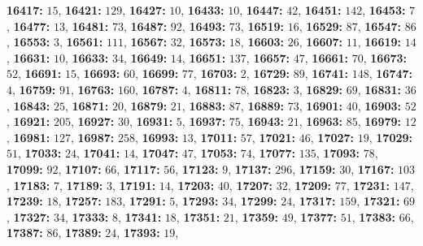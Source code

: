\textsf{\bfseries 16417:} $15$, \textsf{\bfseries 16421:} $129$, \textsf{\bfseries 16427:} $10$, \textsf{\bfseries 16433:} $10$, \textsf{\bfseries 16447:} $42$, \textsf{\bfseries 16451:} $142$, \textsf{\bfseries 16453:} $7$, \textsf{\bfseries 16477:} $13$, \textsf{\bfseries 16481:} $73$, \textsf{\bfseries 16487:} $92$, \textsf{\bfseries 16493:} $73$, \textsf{\bfseries 16519:} $16$, \textsf{\bfseries 16529:} $87$, \textsf{\bfseries 16547:} $86$, \textsf{\bfseries 16553:} $3$, \textsf{\bfseries 16561:} $111$, \textsf{\bfseries 16567:} $32$, \textsf{\bfseries 16573:} $18$, \textsf{\bfseries 16603:} $26$, \textsf{\bfseries 16607:} $11$, \textsf{\bfseries 16619:} $14$, \textsf{\bfseries 16631:} $10$, \textsf{\bfseries 16633:} $34$, \textsf{\bfseries 16649:} $14$, \textsf{\bfseries 16651:} $137$, \textsf{\bfseries 16657:} $47$, \textsf{\bfseries 16661:} $70$, \textsf{\bfseries 16673:} $52$, \textsf{\bfseries 16691:} $15$, \textsf{\bfseries 16693:} $60$, \textsf{\bfseries 16699:} $77$, \textsf{\bfseries 16703:} $2$, \textsf{\bfseries 16729:} $89$, \textsf{\bfseries 16741:} $148$, \textsf{\bfseries 16747:} $4$, \textsf{\bfseries 16759:} $91$, \textsf{\bfseries 16763:} $160$, \textsf{\bfseries 16787:} $4$, \textsf{\bfseries 16811:} $78$, \textsf{\bfseries 16823:} $3$, \textsf{\bfseries 16829:} $69$, \textsf{\bfseries 16831:} $36$, \textsf{\bfseries 16843:} $25$, \textsf{\bfseries 16871:} $20$, \textsf{\bfseries 16879:} $21$, \textsf{\bfseries 16883:} $87$, \textsf{\bfseries 16889:} $73$, \textsf{\bfseries 16901:} $40$, \textsf{\bfseries 16903:} $52$, \textsf{\bfseries 16921:} $205$, \textsf{\bfseries 16927:} $30$, \textsf{\bfseries 16931:} $5$, \textsf{\bfseries 16937:} $75$, \textsf{\bfseries 16943:} $21$, \textsf{\bfseries 16963:} $85$, \textsf{\bfseries 16979:} $12$, \textsf{\bfseries 16981:} $127$, \textsf{\bfseries 16987:} $258$, \textsf{\bfseries 16993:} $13$, \textsf{\bfseries 17011:} $57$, \textsf{\bfseries 17021:} $46$, \textsf{\bfseries 17027:} $19$, \textsf{\bfseries 17029:} $51$, \textsf{\bfseries 17033:} $24$, \textsf{\bfseries 17041:} $14$, \textsf{\bfseries 17047:} $47$, \textsf{\bfseries 17053:} $74$, \textsf{\bfseries 17077:} $135$, \textsf{\bfseries 17093:} $78$, \textsf{\bfseries 17099:} $92$, \textsf{\bfseries 17107:} $66$, \textsf{\bfseries 17117:} $56$, \textsf{\bfseries 17123:} $9$, \textsf{\bfseries 17137:} $296$, \textsf{\bfseries 17159:} $30$, \textsf{\bfseries 17167:} $103$, \textsf{\bfseries 17183:} $7$, \textsf{\bfseries 17189:} $3$, \textsf{\bfseries 17191:} $14$, \textsf{\bfseries 17203:} $40$, \textsf{\bfseries 17207:} $32$, \textsf{\bfseries 17209:} $77$, \textsf{\bfseries 17231:} $147$, \textsf{\bfseries 17239:} $18$, \textsf{\bfseries 17257:} $183$, \textsf{\bfseries 17291:} $5$, \textsf{\bfseries 17293:} $34$, \textsf{\bfseries 17299:} $24$, \textsf{\bfseries 17317:} $159$, \textsf{\bfseries 17321:} $69$, \textsf{\bfseries 17327:} $34$, \textsf{\bfseries 17333:} $8$, \textsf{\bfseries 17341:} $18$, \textsf{\bfseries 17351:} $21$, \textsf{\bfseries 17359:} $49$, \textsf{\bfseries 17377:} $51$, \textsf{\bfseries 17383:} $66$, \textsf{\bfseries 17387:} $86$, \textsf{\bfseries 17389:} $24$, \textsf{\bfseries 17393:} $19$, 
